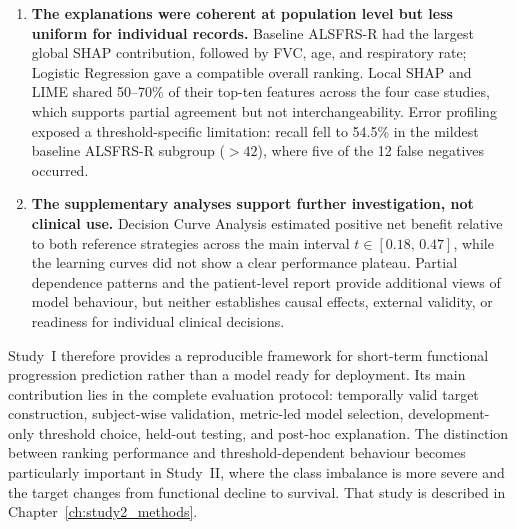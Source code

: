 \begin{enumerate}
  \item \textbf{The explanations were coherent at population level but less uniform for individual records.}
    Baseline \gls{ALSFRS-R} had the largest global SHAP contribution, followed by \gls{FVC}, age, and respiratory rate; Logistic Regression gave a compatible overall ranking.
    Local SHAP and \gls{LIME} shared 50--70\% of their top-ten features across the four case studies, which supports partial agreement but not interchangeability.
    Error profiling exposed a threshold-specific limitation: recall fell to 54.5\% in the mildest baseline \gls{ALSFRS-R} subgroup ($>42$), where five of the 12 false negatives occurred.

  \item \textbf{The supplementary analyses support further investigation, not clinical use.}
    Decision Curve Analysis estimated positive net benefit relative to both reference strategies across the main interval $t\in[0.18,\,0.47]$, while the learning curves did not show a clear performance plateau.
    Partial dependence patterns and the patient-level report provide additional views of model behaviour, but neither establishes causal effects, external validity, or readiness for individual clinical decisions.
\end{enumerate}

\bigskip
\noindent
Study~I therefore provides a reproducible framework for short-term functional progression prediction rather than a model ready for deployment.
Its main contribution lies in the complete evaluation protocol: temporally valid target construction, subject-wise validation, metric-led model selection, development-only threshold choice, held-out testing, and post-hoc explanation.
The distinction between ranking performance and threshold-dependent behaviour becomes particularly important in Study~II, where the class imbalance is more severe and the target changes from functional decline to survival.
That study is described in Chapter~\ref{ch:study2_methods}.
